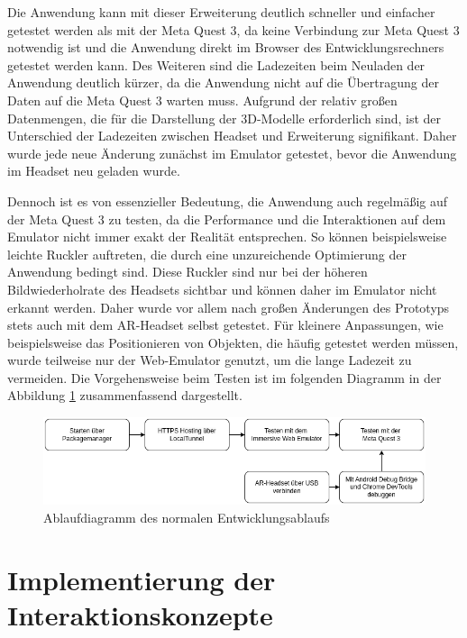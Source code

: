 Die Anwendung kann mit dieser Erweiterung deutlich schneller und einfacher getestet werden als mit der Meta Quest 3, da keine Verbindung zur Meta Quest 3 notwendig ist und die Anwendung direkt im Browser des Entwicklungsrechners getestet werden kann.
Des Weiteren sind die Ladezeiten beim Neuladen der Anwendung deutlich kürzer, da die Anwendung nicht auf die Übertragung der Daten auf die Meta Quest 3 warten muss.
Aufgrund der relativ großen Datenmengen, die für die Darstellung der 3D-Modelle erforderlich sind, ist der Unterschied der Ladezeiten zwischen Headset und Erweiterung signifikant.
Daher wurde jede neue Änderung zunächst im Emulator getestet, bevor die Anwendung im Headset neu geladen wurde.

Dennoch ist es von essenzieller Bedeutung, die Anwendung auch regelmäßig auf der Meta Quest 3 zu testen, da die Performance und die Interaktionen auf dem Emulator nicht immer exakt der Realität entsprechen.
So können beispielsweise leichte Ruckler auftreten, die durch eine unzureichende Optimierung der Anwendung bedingt sind.
Diese Ruckler sind nur bei der höheren Bildwiederholrate des Headsets sichtbar und können daher im Emulator nicht erkannt werden.
Daher wurde vor allem nach großen Änderungen des Prototyps stets auch mit dem AR-Headset selbst getestet.
Für kleinere Anpassungen, wie beispielsweise das Positionieren von Objekten, die häufig getestet werden müssen, wurde teilweise nur der Web-Emulator genutzt, um die lange Ladezeit zu vermeiden.
Die Vorgehensweise beim Testen ist im folgenden Diagramm in der Abbildung \ref{fig:webxr-entwicklung} zusammenfassend dargestellt.

\begin{figure}[H]
    \centering
    \includegraphics[width=1\textwidth]{images/WebXR-Entwicklung.png}
    \caption{Ablaufdiagramm des normalen Entwicklungsablaufs}
    \label{fig:webxr-entwicklung}
\end{figure}

\newpage

\section{Implementierung der Interaktionskonzepte}

